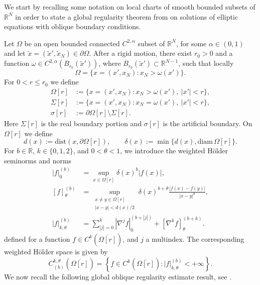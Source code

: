 \documentclass[10pt,a4paper]{amsart}
\numberwithin{equation}{section}
\newcommand{\R}{\mathbb{R}}
\begin{document}
We start by recalling some notation on local charts of smooth bounded subsets of $\R^N$ in order to state a global regularity theorem from \cite{Lieberman12} on solutions of elliptic equations with oblique boundary  conditions.

Let $\Omega$ be an open bounded connected $C^{2,\alpha}$ subset of $\R^N$, for some $\alpha\in(0,1)$ and let $\tilde{x} = (\tilde{x}',\tilde{x}_N) \in\partial\Omega$. After a rigid motion, there exist $r_0>0$ and a function $\omega\in C^{2,\alpha}(B_{r_0}(\tilde{x}'))$, where $B_{r_0}(\tilde{x}')\subset\R^{N-1}$, such that locally
\[
    \Omega = \{x=(x',x_N) \colon x_N>\omega(x')\}.
\]
For $0<r\le r_0$ we define
\begin{equation*}
\begin{aligned}
\Omega[r]&:=\{x=(x',x_N)\colon x_N > \omega(x'),\ |x'|<r\},\\
\Sigma[r]&:=\{x=(x',x_N)\colon x_N = \omega(x'),\ |x'|<r\},\\
\sigma[r]&:=\partial\Omega[r]\setminus\Sigma[r].
\end{aligned}
\end{equation*}
Here $\Sigma[r]$ is the real boundary portion and $\sigma[r]$ is the artificial boundary. On $\Omega[r]$ we define
\begin{equation}\label{eq d and delta}
    d(x):= \mathrm{dist}(x,\partial \Omega[r]),\qquad \delta(x):= \min \{d(x), \mathrm{diam}\,\Omega[r]\}.
\end{equation}
For $b\in\R$, $k\in \{0,1,2\}$, and $0<\theta<1$, we introduce the weighted H\"older seminorms and norms
\[
\begin{aligned}
    |f|_0^{(b)}&=\sup_{x\in\Omega[r]}\delta(x)^b|f(x)|,\\
    [f]_{\theta}^{(b)}&=
    \sup_{\substack{x\ne y\in\Omega[r]\\ |x-y|<d(x)/2}}
    \delta(x)^{b+\theta}\frac{|f(x)-f(y)|}{|x-y|^{\theta}},\\
    |f|_{k,\theta}^{(b)}&=\sum_{|j|=0}^k |\nabla^j f|_0^{(b+|j|)}+[\nabla^k f]_{\theta}^{(b+k)}.
\end{aligned}    
\]
defined for a function $f \in C^k(\overline{\Omega[r]})$, and $j$ a multindex. The corresponding weighted H\"older space is given by
\[
    C_{(b)}^{k,\theta}(\overline{\Omega[r]})=\left\{ f \in C^k(\overline{\Omega[r]}) \colon |f|_{k,\theta}^{(b)}<+\infty\right\}.
\]
We now recall the following global oblique regularity estimate result, see \cite[Proposition 11.21]{Lieberman12}.
\end{document}
